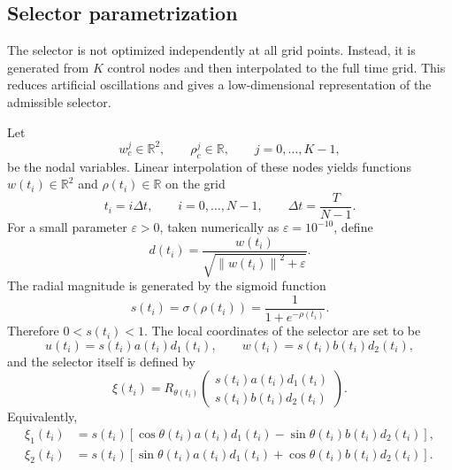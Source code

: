\documentclass[11pt]{article}
\theoremstyle{definition}
\theoremstyle{remark}
\newcommand{\R}{\mathbb{R}}
\newcommand{\norm}[1]{\left\lVert #1\right\rVert}
\begin{document}
\subsection{Selector parametrization}
\label{subsec:parametrization}

The selector is not optimized independently at all grid points. Instead, it is generated from $K$ control nodes and then interpolated to the full time grid. This reduces artificial oscillations and gives a low-dimensional representation of the admissible selector.

Let
\begin{equation}
    w_c^j\in\R^2, \qquad \rho_c^j\in\R, \qquad j=0,\ldots,K-1,
    \label{eq:control-nodes}
\end{equation}
be the nodal variables. Linear interpolation of these nodes yields functions $w(t_i)\in\R^2$ and $\rho(t_i)\in\R$ on the grid
\begin{equation}
    t_i=i\Delta t, \qquad i=0,\ldots,N-1, \qquad
    \Delta t=\frac{T}{N-1}.
    \label{eq:grid}
\end{equation}
For a small parameter $\varepsilon>0$, taken numerically as $\varepsilon=10^{-10}$, define
\begin{equation}
    d(t_i)=\frac{w(t_i)}{\sqrt{\norm{w(t_i)}^2+\varepsilon}}.
    \label{eq:direction}
\end{equation}
The radial magnitude is generated by the sigmoid function
\begin{equation}
    s(t_i)=\sigma(\rho(t_i))=\frac{1}{1+e^{-\rho(t_i)}}.
    \label{eq:sigmoid}
\end{equation}
Therefore $0<s(t_i)<1$. The local coordinates of the selector are set to be
\begin{equation}
    u(t_i)=s(t_i)a(t_i)d_1(t_i),
    \qquad
    w(t_i)=s(t_i)b(t_i)d_2(t_i),
    \label{eq:local-selector}
\end{equation}
and the selector itself is defined by
\begin{equation}
    \xi(t_i)=R_{\theta(t_i)}
    \begin{pmatrix}
    s(t_i)a(t_i)d_1(t_i)\\
    s(t_i)b(t_i)d_2(t_i)
    \end{pmatrix}.
    \label{eq:selector}
\end{equation}
Equivalently,
\begin{align}
    \xi_1(t_i)
    &=s(t_i)\left[
    \cos\theta(t_i)a(t_i)d_1(t_i)
    -\sin\theta(t_i)b(t_i)d_2(t_i)
    \right],
    \label{eq:xi-one}\\
    \xi_2(t_i)
    &=s(t_i)\left[
    \sin\theta(t_i)a(t_i)d_1(t_i)
    +\cos\theta(t_i)b(t_i)d_2(t_i)
    \right].
    \label{eq:xi-two}
\end{align}
\end{document}
